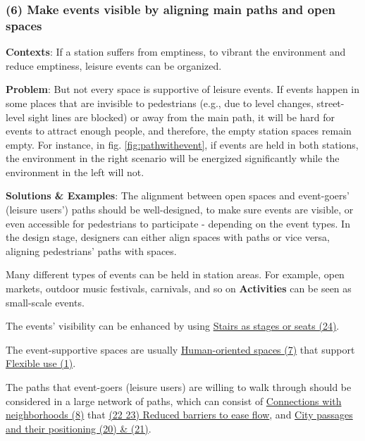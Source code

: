 \documentclass[]{article}
\begin{document}
{\subsubsection{(6) Make events visible by aligning main paths and open spaces}
\label{(6) Make events visible by aligning main paths and open spaces}

\textbf{Contexts}: If a station suffers from emptiness, to vibrant the environment and reduce emptiness, leisure events can be organized.

\textbf{Problem}: But not every space is supportive of leisure events. If events happen in some places that are invisible to pedestrians (e.g., due to level changes, street-level sight lines are blocked) or away from the main path, it will be hard for events to attract enough people, and therefore, the empty station spaces remain empty. For instance, in fig. \ref{fig:pathwithevent}, if events are held in both stations, the environment in the right scenario will be energized significantly while the environment in the left will not.

\textbf{Solutions \& Examples}: The alignment between open spaces and event-goers' (leisure users') paths should be well-designed, to make sure events are visible, or even accessible for pedestrians to participate - depending on the event types. In the design stage, designers can either align spaces with paths or vice versa, aligning pedestrians' paths with spaces. 

Many different types of events can be held in station areas. For example, open markets, outdoor music festivals, carnivals, and so on \citep{smithStagingCityEvents2021}
\textbf{Activities} can be seen as small-scale events. 

The events' visibility can be enhanced by using \hyperref[(24) Stairs as stages or seats]{Stairs as stages or seats (24)}.

The event-supportive spaces are usually \hyperref[(7) Human-oriented spaces]{Human-oriented spaces (7)} that support \hyperref[(1) Flexible use]{Flexible use (1)}.

The paths that event-goers (leisure users) are willing to walk through should be considered in a large network of paths, which can consist of \hyperref[Connect with neighborhoods]{Connections with neighborhoods (8)} that \hyperref[(22 23) Reduce barriers to ease flow]{(22 23) Reduced barriers to ease flow}, and \hyperref[(20 21) City passages and their positioning]{City passages and their positioning (20) \& (21)}.

}
\end{document}
